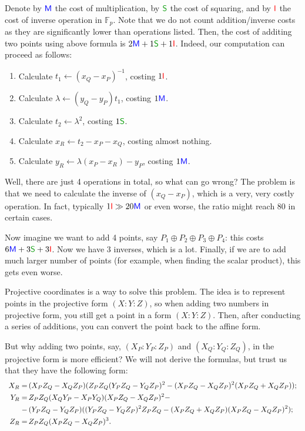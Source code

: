 \documentclass[../lecture-notes.tex]{subfiles}
\begin{document}
Denote by $\textcolor{blue}{\mathsf{M}}$ the cost of multiplication, by $\textcolor{green!60!black}{\mathsf{S}}$ the cost of squaring, and by $\textcolor{red}{\mathsf{I}}$ the cost of inverse operation in $\mathbb{F}_p$. Note that we do not count addition/inverse costs as they are significantly lower than operations listed. Then, the cost of additing two points using above formula is $2\textcolor{blue}{\mathsf{M}} + 1\textcolor{green!60!black}{\mathsf{S}} + 1\textcolor{red}{\mathsf{I}}$. Indeed, our computation can proceed as follows:
\begin{enumerate}
    \item Calculate $t_1 \gets (x_Q-x_P)^{-1}$, costing $1\textcolor{red}{\mathsf{I}}$.
    \item Calculate $\lambda \gets (y_Q-y_P)t_1$, costing $1\textcolor{blue}{\mathsf{M}}$.
    \item Calculate $t_2 \gets \lambda^2$, costing $1\textcolor{green!60!black}{\mathsf{S}}$.
    \item Calculate $x_R \gets t_2 - x_P - x_Q$, costing almost nothing.
    \item Calculate $y_R \gets \lambda (x_P-x_R) - y_P$, costing $1\textcolor{blue}{\mathsf{M}}$.
\end{enumerate}

Well, there are just 4 operations in total, so what can go wrong? The problem is that we need to calculate the inverse of $(x_Q-x_P)$, which is a very, very costly operation. In fact, typically $1\textcolor{red}{\mathsf{I}} \gg 20\textcolor{blue}{\mathsf{M}}$ or even worse, the ratio might reach $80$ in certain cases.

Now imagine we want to add 4 points, say $P_1 \oplus P_2 \oplus P_3 \oplus P_4$: this costs $6\textcolor{blue}{\mathsf{M}} + 3\textcolor{green!60!black}{\mathsf{S}} + 3\textcolor{red}{\mathsf{I}}$. Now we have 3 inverses, which is a lot. Finally, if we are to add much larger number of points (for example, when finding the scalar product), this gets even worse. 

Projective coordinates is a way to solve this problem. The idea is to represent points in the projective form $(X:Y:Z)$, so when adding two numbers in projective form, you still get a point in a form $(X:Y:Z)$. Then, after conducting a series of additions, you can convert the point back to the affine form. 

But why adding two points, say, $(X_P:Y_P:Z_P)$ and $(X_Q:Y_Q:Z_Q)$, in the projective form is more efficient? We will not derive the formulas, but trust us that they have the following form:
\begin{equation*}
    \scalebox{0.9}{$
    \begin{aligned}
        X_R = \, &(X_PZ_Q - X_QZ_P)(Z_PZ_Q(Y_PZ_Q-Y_QZ_P)^2 - (X_PZ_Q-X_QZ_P)^2(X_PZ_Q+X_QZ_P)); \\
        Y_R = \, &Z_PZ_Q(X_QY_P - X_PY_Q)(X_PZ_Q-X_QZ_P)^2 - \\ - \, &(Y_PZ_Q-Y_QZ_P)((Y_PZ_Q-Y_QZ_P)^2Z_PZ_Q-(X_PZ_Q+X_QZ_P)(X_PZ_Q-X_QZ_P)^2); \\
        Z_R = \, &Z_PZ_Q(X_PZ_Q - X_QZ_P)^3.
    \end{aligned}
    $}
\end{equation*}
\end{document}
